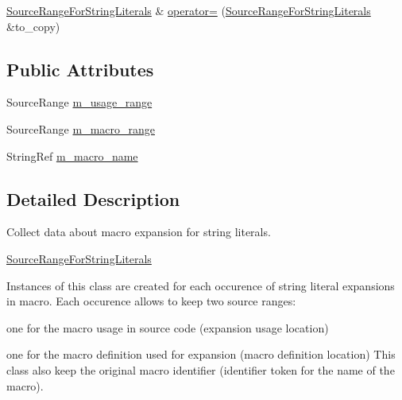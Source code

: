\begin{DoxyCompactItemize}
\item 
\hyperlink{classclang_1_1tidy_1_1pagesjaunes_1_1_exec_s_q_l_close_to_function_call_1_1_source_range_for_string_literals}{Source\+Range\+For\+String\+Literals} \& \hyperlink{classclang_1_1tidy_1_1pagesjaunes_1_1_exec_s_q_l_close_to_function_call_1_1_source_range_for_string_literals_a17cd4abbeaec70c6893801a9857a3ce2}{operator=} (\hyperlink{classclang_1_1tidy_1_1pagesjaunes_1_1_exec_s_q_l_close_to_function_call_1_1_source_range_for_string_literals}{Source\+Range\+For\+String\+Literals} \&to\+\_\+copy)
\end{DoxyCompactItemize}
\subsection*{Public Attributes}
\begin{DoxyCompactItemize}
\item 
Source\+Range \hyperlink{classclang_1_1tidy_1_1pagesjaunes_1_1_exec_s_q_l_close_to_function_call_1_1_source_range_for_string_literals_aa02e7225047b0af1bfcb3a240ba597f6}{m\+\_\+usage\+\_\+range}
\item 
Source\+Range \hyperlink{classclang_1_1tidy_1_1pagesjaunes_1_1_exec_s_q_l_close_to_function_call_1_1_source_range_for_string_literals_aeda4e01cda4593df7d2add9b28f314f3}{m\+\_\+macro\+\_\+range}
\item 
String\+Ref \hyperlink{classclang_1_1tidy_1_1pagesjaunes_1_1_exec_s_q_l_close_to_function_call_1_1_source_range_for_string_literals_a959b94c0fb33653b1c858a1918b0aa6e}{m\+\_\+macro\+\_\+name}
\end{DoxyCompactItemize}


\subsection{Detailed Description}
Collect data about macro expansion for string literals. 

\hyperlink{classclang_1_1tidy_1_1pagesjaunes_1_1_exec_s_q_l_close_to_function_call_1_1_source_range_for_string_literals}{Source\+Range\+For\+String\+Literals}

Instances of this class are created for each occurence of string literal expansions in macro. Each occurence allows to keep two source ranges\+:
\begin{DoxyItemize}
\item one for the macro usage in source code (expansion usage location)
\item one for the macro definition used for expansion (macro definition location) This class also keep the original macro identifier (identifier token for the name of the macro). 
\end{DoxyItemize}

